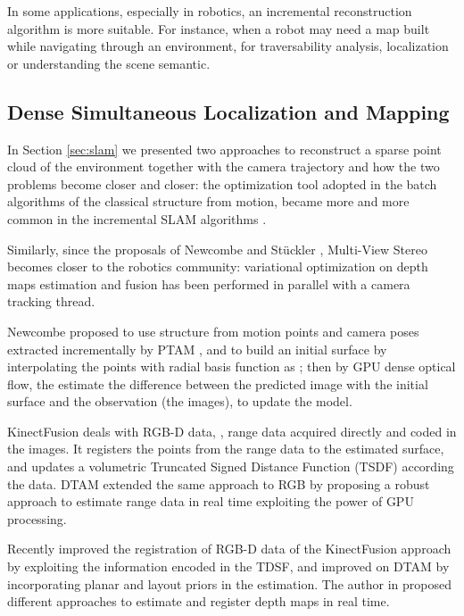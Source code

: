 In some applications, especially in robotics, an incremental reconstruction algorithm is more suitable. For instance, when a robot may need a map built while navigating through an environment, for traversability analysis, localization or understanding the scene semantic.
\subsection{Dense Simultaneous Localization and Mapping}
In Section \ref{sec:slam} we presented two approaches to reconstruct a sparse point cloud of the environment together with the camera trajectory and how the two problems become closer and closer: the optimization tool adopted in the batch algorithms of the classical structure from motion, became more and more common in the incremental SLAM algorithms \cite{mouragnon_et_al07,strasdat11}.

Similarly, since the proposals of Newcombe \etal \cite{newcombe2010live,newcombe2011kinectfusion,newcombe2011dtam} and St{\"u}ckler \etal \cite{stuhmer2010real}, Multi-View Stereo becomes closer to the robotics community: variational optimization on depth maps estimation and fusion has been performed in parallel with a camera tracking thread.

Newcombe \etal \cite{newcombe2010live} proposed to use structure from motion points and camera poses extracted incrementally by PTAM \cite{klein_murray07}, and to build an initial surface by interpolating the points with radial basis function as \cite{ohtake2003multi}; then by GPU dense optical flow, the estimate the difference between the predicted image with the initial surface and the observation (the images), to update the model.

KinectFusion \cite{newcombe2011kinectfusion} deals with RGB-D data, \ie, range data acquired  directly and coded in the images. It registers the points from the range data to the estimated surface, and updates  a volumetric Truncated Signed Distance Function (TSDF) according the data. DTAM \cite{newcombe2011dtam} extended the same approach to RGB by proposing a robust approach to estimate range data in real time exploiting the power of GPU processing.

Recently \cite{bylow2013real} improved the registration of RGB-D data of the KinectFusion approach by exploiting the information encoded in the TDSF, and \cite{concha2015incorporating} improved on DTAM by incorporating planar and layout priors in the estimation. The author in \cite{stuhmer2012parallel,stuckler2014multi} proposed different approaches to estimate and register depth maps in real time.

